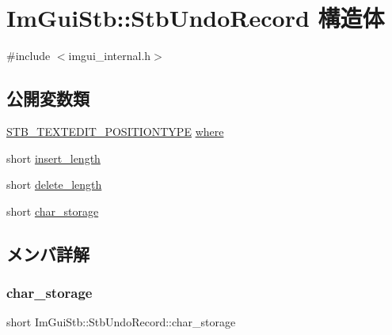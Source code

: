 \hypertarget{struct_im_gui_stb_1_1_stb_undo_record}{}\section{Im\+Gui\+Stb\+:\+:Stb\+Undo\+Record 構造体}
\label{struct_im_gui_stb_1_1_stb_undo_record}


{\ttfamily \#include $<$imgui\+\_\+internal.\+h$>$}

\subsection*{公開変数類}
\begin{DoxyCompactItemize}
\item 
\mbox{\hyperlink{stb__textedit_8h_a5d0c1b8751b6517e3d817f2a025ed654}{S\+T\+B\+\_\+\+T\+E\+X\+T\+E\+D\+I\+T\+\_\+\+P\+O\+S\+I\+T\+I\+O\+N\+T\+Y\+PE}} \mbox{\hyperlink{struct_im_gui_stb_1_1_stb_undo_record_acd3cbeaa50d642520c1a317c7d89a47b}{where}}
\item 
short \mbox{\hyperlink{struct_im_gui_stb_1_1_stb_undo_record_a588a05bfd8e4702d6af78d21141d3b89}{insert\+\_\+length}}
\item 
short \mbox{\hyperlink{struct_im_gui_stb_1_1_stb_undo_record_aca8b20387e3b7d890a21638109574279}{delete\+\_\+length}}
\item 
short \mbox{\hyperlink{struct_im_gui_stb_1_1_stb_undo_record_a5641d98f1c3611383d07cca2c5596a8e}{char\+\_\+storage}}
\end{DoxyCompactItemize}


\subsection{メンバ詳解}
\mbox{\label{struct_im_gui_stb_1_1_stb_undo_record_a5641d98f1c3611383d07cca2c5596a8e}} 
\subsubsection{\texorpdfstring{char\+\_\+storage}{char\_storage}}
{\footnotesize\ttfamily short Im\+Gui\+Stb\+::\+Stb\+Undo\+Record\+::char\+\_\+storage}


